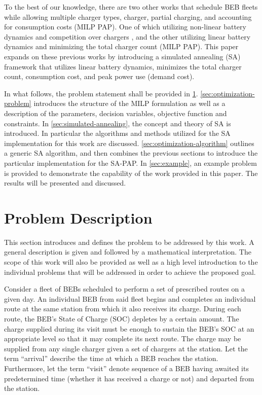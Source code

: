 \documentclass[11pt,a4paper,final]{article}
\begin{document}
To the best of our knowledge, there are two other works that schedule BEB fleets while allowing multiple charger types,
charger, partial charging, and accounting for consumption costs \cite{whitaker-2023-a-network}(MILP PAP). One of which
utilizing non-linear battery dynamics and competition over chargers \cite{whitaker-2023-a-network}, and the other
utilizing linear battery dynamics and minimizing the total charger count (MILP PAP). This paper expands on these
previous works by introducing a simulated annealing (SA) framework that utilizes linear battery dynamics, minimizes the
total charger count, consumption cost, and peak power use (demand cost).

In what follows, the problem statement shall be provided in \ref{sec:problem-description}. \ref{sec:optimization-problem}
introduces the structure of the MILP formulation as well as a description of the parameters, decision variables,
objective function and constraints. In \ref{sec:simulated-annealing}, the concept and theory of SA is introduced. In
particular the algorithms and methods utilized for the SA implementation for this work are discussed.
\ref{sec:optimization-algorithm} outlines a generic SA algorithm, and then combines the previous sections to introduce the
particular implementation for the SA-PAP. In \ref{sec:example}, an example problem is provided to demonstrate the capability
of the work provided in this paper. The results will be presented and discussed.
\section{Problem Description}
\label{sec:problem-description}
This section introduces and defines the problem to be addressed by this work. A general description is given and
followed by a mathematical interpretation. The scope of this work will also be provided as well as a high level
introduction to the individual problems that will be addressed in order to achieve the proposed goal.

Consider a fleet of BEBs scheduled to perform a set of prescribed routes on a given day. An individual BEB from said
fleet begins and completes an individual route at the same station from which it also receives its charge. During each
route, the BEB's State of Charge (SOC) depletes by a certain amount. The charge supplied during its visit must be enough
to sustain the BEB's SOC at an appropriate level so that it may complete its next route. The charge may be supplied from
any single charger given a set of chargers at the station. Let the term ``arrival'' describe the time at which a BEB
reaches the station. Furthermore, let the term ``visit'' denote sequence of a BEB having awaited its predetermined time
(whether it has received a charge or not) and departed from the station.
\end{document}

